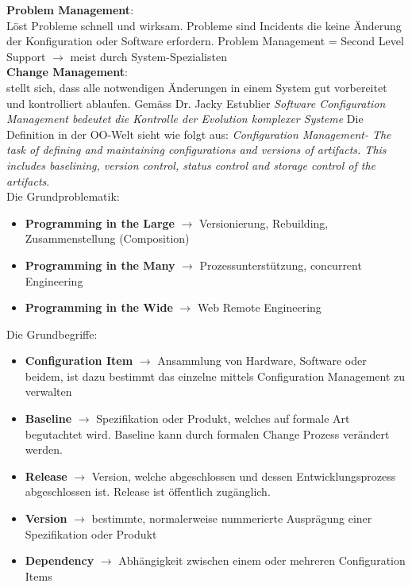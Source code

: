 \documentclass{report}
\theoremstyle{definition}
\theoremstyle{example}
\begin{document}
\textbf{Problem Management}: \\
Löst Probleme schnell und wirksam. Probleme sind Incidents die keine Änderung der Konfiguration oder Software erfordern. Problem Management = Second Level Support $\rightarrow$ meist durch System-Spezialisten\\

\textbf{Change Management}:\\
stellt sich, dass alle notwendigen Änderungen in einem System gut vorbereitet und kontrolliert ablaufen. Gemäss Dr. Jacky Estublier \textit{Software Configuration Management bedeutet die Kontrolle der Evolution komplexer Systeme} Die Definition in der OO-Welt sieht wie folgt aus: \textit{Configuration Management- The task of defining and maintaining configurations and versions of artifacts. This includes baselining, version control, status control and storage control of the artifacts}. \\
Die Grundproblematik:\\
\begin{itemize}
	\item \textbf{Programming in the Large} $\rightarrow$ Versionierung, Rebuilding, Zusammenstellung (Composition)
	\item \textbf{Programming in the Many} $\rightarrow$ Prozessunterstützung, concurrent Engineering
	\item \textbf{Programming in the Wide} $\rightarrow$ Web Remote Engineering
\end{itemize}

Die Grundbegriffe:\\
\begin{itemize}
	\item \textbf{Configuration Item} $\rightarrow$ Ansammlung von Hardware, Software oder beidem, ist dazu bestimmt das einzelne mittels Configuration Management zu verwalten
	\item \textbf{Baseline} $\rightarrow$ Spezifikation oder Produkt, welches auf formale Art begutachtet wird. Baseline kann durch formalen Change Prozess verändert werden.
	\item \textbf{Release} $\rightarrow$ Version, welche abgeschlossen und dessen Entwicklungsprozess abgeschlossen ist. Release ist öffentlich zugänglich.
	\item \textbf{Version} $\rightarrow$ bestimmte, normalerweise nummerierte Ausprägung einer Spezifikation oder Produkt
	\item \textbf{Dependency} $\rightarrow$ Abhängigkeit zwischen einem oder mehreren Configuration Items


\end{itemize}
\end{document}
